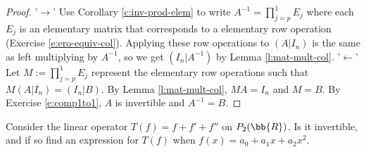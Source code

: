 \begin{proof}
'$\to$' Use Corollary \ref{c:inv-prod-elem} to write $A^{-1}= \prod_{j=p}^1E_j$ where each $E_j$ is an elementary matrix that corresponds to a elementary row operation (Exercise \ref{e:ero-equiv-col}). Applying these row operations to $(A|I_n)$ is the same as left multiplying by $A^{-1}$, so we get $(I_n|A^{-1})$ by Lemma \ref{l:mat-mult-col}.
'$\leftarrow$' Let $M:= \prod_{j=p}^1E_j$ represent the elementary row operations such that $M(A|I_n)=(I_n|B)$. By Lemma \ref{l:mat-mult-col}, $MA=I_n$ and $M=B$. By Exercise \ref{e:comp1to1}, $A$ is invertible and $A^{-1}=B$.
\end{proof}
\begin{example}
Consider the linear operator $T(f)=f+f'+f''$ on $P_2(\bb{R})$. Is it invertible, and if so find an expression for $T(f)$ when $f(x)=a_0+a_1x+a_2x^2$.
\end{example}

